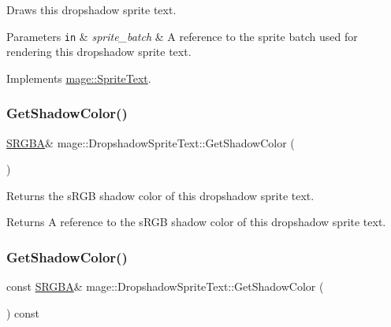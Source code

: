 Draws this dropshadow sprite text.


\begin{DoxyParams}[1]{Parameters}
\mbox{\tt in}  & {\em sprite\+\_\+batch} & A reference to the sprite batch used for rendering this dropshadow sprite text. \\
\hline
\end{DoxyParams}


Implements \hyperlink{classmage_1_1_sprite_text_a45d5ac8410d5a46b26e8491946a2ad9e}{mage\+::\+Sprite\+Text}.

\hypertarget{classmage_1_1_dropshadow_sprite_text_ae397446f32257519efb24766edc0d0e8}{}\label{classmage_1_1_dropshadow_sprite_text_ae397446f32257519efb24766edc0d0e8} 
\subsubsection{\texorpdfstring{Get\+Shadow\+Color()}{GetShadowColor()}\hspace{0.1cm}{\footnotesize\ttfamily [1/2]}}
{\footnotesize\ttfamily \hyperlink{structmage_1_1_s_r_g_b_a}{S\+R\+G\+BA}\& mage\+::\+Dropshadow\+Sprite\+Text\+::\+Get\+Shadow\+Color (\begin{DoxyParamCaption}{ }\end{DoxyParamCaption})\hspace{0.3cm}{\ttfamily [noexcept]}}

Returns the s\+R\+GB shadow color of this dropshadow sprite text.

\begin{DoxyReturn}{Returns}
A reference to the s\+R\+GB shadow color of this dropshadow sprite text. 
\end{DoxyReturn}
\hypertarget{classmage_1_1_dropshadow_sprite_text_ac441bdd3e94d80a27d33af2a01207704}{}\label{classmage_1_1_dropshadow_sprite_text_ac441bdd3e94d80a27d33af2a01207704} 
\subsubsection{\texorpdfstring{Get\+Shadow\+Color()}{GetShadowColor()}\hspace{0.1cm}{\footnotesize\ttfamily [2/2]}}
{\footnotesize\ttfamily const \hyperlink{structmage_1_1_s_r_g_b_a}{S\+R\+G\+BA}\& mage\+::\+Dropshadow\+Sprite\+Text\+::\+Get\+Shadow\+Color (\begin{DoxyParamCaption}{ }\end{DoxyParamCaption}) const\hspace{0.3cm}{\ttfamily [noexcept]}}

